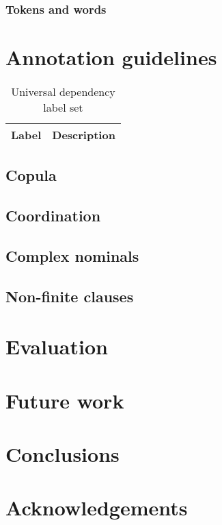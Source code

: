 \documentclass[a4paper,11pt, onecolumn]{article}
\begin{document}

\subsubsection{Tokens and words}


\section{Annotation guidelines}



\begin{table}
  \centering
  \begin{tabular}{|l|l|}
    \hline
    \textbf{Label} & \textbf{Description} \\

    \hline
  \end{tabular}
  \caption{Universal dependency label set}
\end{table}

\subsection{Copula}

\subsection{Coordination}

\subsection{Complex nominals}


\subsection{Non-finite clauses}

\section{Evaluation}

\section{Future work}




\section{Conclusions}

\section*{Acknowledgements}



\end{document}
